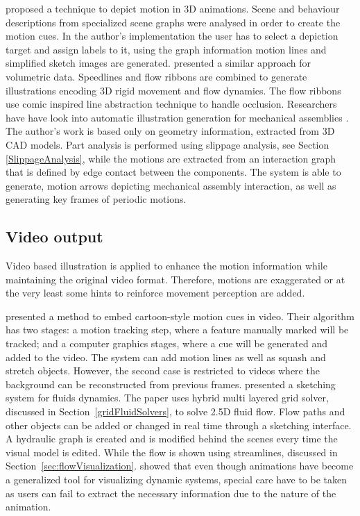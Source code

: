 \cite{Nienhaus2005} proposed a technique to depict motion in 3D animations.
Scene and behaviour descriptions from specialized scene graphs were analysed in order to create the motion cues.
In the author's implementation the user has to select a depiction target and assign labels to it, using the graph information motion lines and simplified sketch images are generated.
\cite{Joshi2005} presented a similar approach for volumetric data.
Speedlines and flow ribbons are combined to generate illustrations encoding 3D rigid movement and flow dynamics.
The flow ribbons use comic inspired line abstraction technique to handle occlusion.
Researchers have have look into automatic illustration generation for mechanical assemblies \cite{Mitra2010}.
The author's work is based only on geometry information, extracted from 3D CAD models.
Part analysis is performed using slippage analysis, see Section \ref{SlippageAnalysis}, while the motions are extracted from an interaction graph that is defined by edge contact between the components.
The system is able to generate, motion arrows depicting mechanical assembly interaction, as well as generating key frames of periodic motions.

\subsection{Video output}

Video based illustration is applied to enhance the motion information while maintaining the original video format.
Therefore, motions are exaggerated or at the very least some hints to reinforce movement perception are added.

\cite{Collomosse2005} presented a method to embed cartoon-style motion cues in video.
Their algorithm has two stages: a motion tracking step, where a feature manually marked will be tracked; and a computer graphics stages, where a cue will be generated and added to the video.
The system can add motion lines as well as squash and stretch objects.
However, the second case is restricted to videos where the background can be reconstructed from previous frames.
\cite{Zhu2011} presented a sketching system for fluids dynamics.
The paper uses hybrid multi layered grid solver, discussed in Section~\ref{gridFluidSolvers}, to solve 2.5D fluid flow.
Flow paths and other objects can be added or changed in real time through a sketching interface.
A hydraulic graph is created and is modified behind the scenes every time the visual model is edited.
While the flow is shown using streamlines, discussed in Section~\ref{sec:flowVisualization}.
\cite{Lowe2014} showed that even though animations have become a generalized tool for visualizing dynamic systems, special care have to be taken as users can fail to extract the necessary information due to the nature of the animation.